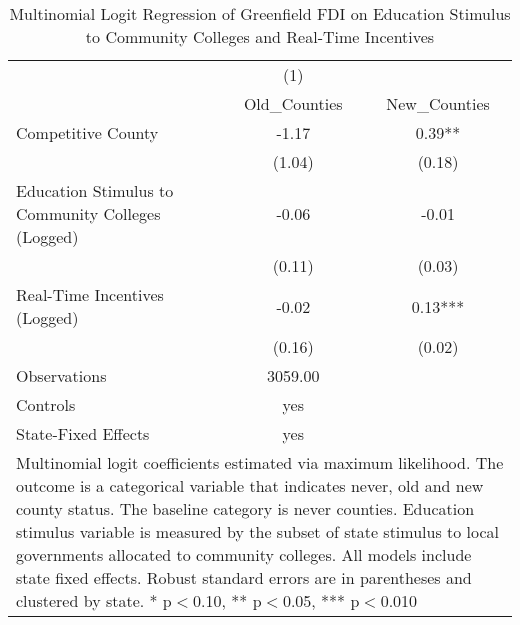 \begin{table}[!htbp]\centering
\def\sym#1{\ifmmode^{#1}\else\(^{#1}\)\fi}
\caption{Multinomial Logit Regression of Greenfield FDI on Education Stimulus to Community Colleges and Real-Time Incentives}
\begin{tabular}{l*{2}{c}}
\hline\hline
                    &         (1)   &               \\
                    &Old_Counties   &New_Counties   \\
\hline
Competitive County  &       -1.17   &        0.39** \\
                    &      (1.04)   &      (0.18)   \\
Education Stimulus to Community Colleges (Logged)&       -0.06   &       -0.01   \\
                    &      (0.11)   &      (0.03)   \\
Real-Time Incentives (Logged)&       -0.02   &        0.13***\\
                    &      (0.16)   &      (0.02)   \\
\hline
Observations        &     3059.00   &               \\
Controls            &         yes   &               \\
State-Fixed Effects &         yes   &               \\
\hline\hline
\multicolumn{3}{p{\linewidth}}{\footnotesize Multinomial logit coefficients estimated via maximum likelihood. The outcome is a categorical variable that indicates  never, old and new county status. The baseline category is never counties. Education stimulus variable is measured by the subset of state stimulus to local governments allocated to community colleges. All models include state fixed effects. Robust standard errors are in parentheses and clustered by state. * p$<$0.10, ** p$<$0.05, *** p$<$0.010}\\
\end{tabular}
\end{table}
